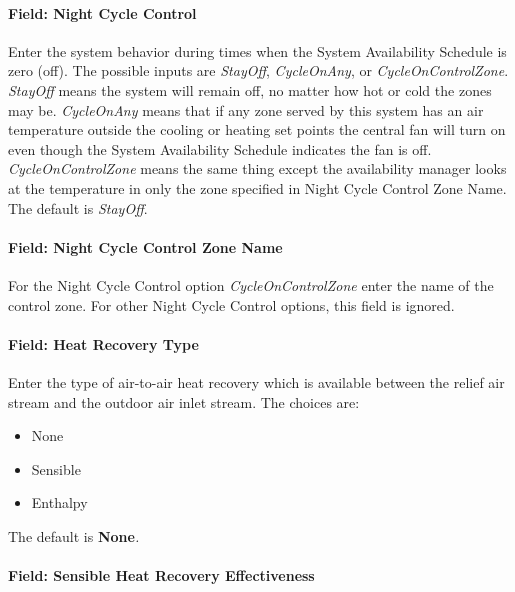 \paragraph{Field: Night Cycle Control}\label{field-night-cycle-control-1}

Enter the system behavior during times when the System Availability Schedule is zero (off). The possible inputs are \emph{StayOff}, \emph{CycleOnAny}, or \emph{CycleOnControlZone}. \emph{StayOff} means the system will remain off, no matter how hot or cold the zones may be. \emph{CycleOnAny} means that if any zone served by this system has an air temperature outside the cooling or heating set points the central fan will turn on even though the System Availability Schedule indicates the fan is off. \emph{CycleOnControlZone} means the same thing except the availability manager looks at the temperature in only the zone specified in Night Cycle Control Zone Name. The default is \emph{StayOff}.

\paragraph{Field: Night Cycle Control Zone Name}\label{field-night-cycle-control-zone-name-1}

For the Night Cycle Control option \emph{CycleOnControlZone} enter the name of the control zone. For other Night Cycle Control options, this field is ignored.

\paragraph{Field: Heat Recovery Type}\label{field-heat-recovery-type-2}

Enter the type of air-to-air heat recovery which is available between the relief air stream and the outdoor air inlet stream. The choices are:

\begin{itemize}
\item
  None
\item
  Sensible
\item
  Enthalpy
\end{itemize}

The default is \textbf{None}\emph{.}

\paragraph{Field: Sensible Heat Recovery Effectiveness}\label{field-sensible-heat-recovery-effectiveness-2}

